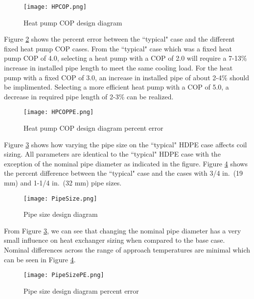 	\begin{figure}
		\centering
		\texttt{[image: HPCOP.png]}
		\caption{Heat pump COP design diagram}
		\label{fig:DesignTools:SpcCooling:HPCOP}
	\end{figure}
	
Figure \ref{fig:DesignTools:SpcCooling:HPCOPPE} shows the percent error between the ``typical" case and the different fixed heat pump COP cases. From the ``typical" case which was a fixed heat pump COP of 4.0, selecting a heat pump with a COP of 2.0 will require a 7-13\% increase in installed pipe length to meet the same cooling load. For the heat pump with a fixed COP of 3.0, an increase in installed pipe of about 2-4\% should be implimented. Selecting a more efficient heat pump with a COP of 5.0, a decrease in required pipe length of 2-3\% can be realized. 
	
	\begin{figure}
		\centering
		\texttt{[image: HPCOPPE.png]}
		\caption{Heat pump COP design diagram percent error}
		\label{fig:DesignTools:SpcCooling:HPCOPPE}
	\end{figure}


Figure \ref{fig:DesignTools:SpcCooling:PipeSize} shows how varying the pipe size on the ``typical" HDPE case affects coil sizing. All parameters are identical to the ``typical" HDPE case with the exception of the nominal pipe diameter as indicated in the figure. Figure \ref{fig:DesignTools:SpcCooling:PipeSizePE} shows the percent difference between the ``typical" case and the cases with 3/4 in.\ (19 mm) and 1-1/4 in.\ (32 mm) pipe sizes.

	\begin{figure}
		\centering
		\texttt{[image: PipeSize.png]}
		\caption{Pipe size design diagram}
		\label{fig:DesignTools:SpcCooling:PipeSize}
	\end{figure}
	
From Figure \ref{fig:DesignTools:SpcCooling:PipeSize}, we can see that changing the nominal pipe diameter has a very small influence on heat exchanger sizing when compared to the base case. Nominal differences across the range of approach temperatures are minimal which can be seen in Figure \ref{fig:DesignTools:SpcCooling:PipeSizePE}. 
	
	\begin{figure}
		\centering
		\texttt{[image: PipeSizePE.png]}
		\caption{Pipe size design diagram percent error}
		\label{fig:DesignTools:SpcCooling:PipeSizePE}
	\end{figure}
	

